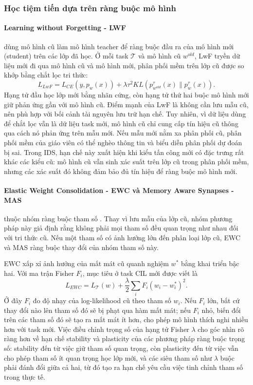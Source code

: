 \subsubsection{Học tiệm tiến dựa trên ràng buộc mô hình}

\paragraph{Learning without Forgetting - LWF}

\cite{li2017lwf} dùng mô hình cũ làm mô hình teacher để ràng buộc đầu ra của mô hình mới (student) trên các lớp đã học. Ở mỗi task $\mathcal{T}$ và mô hình cũ $w^{old}$, LwF tryền dữ liệu mới đi qua mô hình cũ và mô hình mới, phân phối mềm trên lớp cũ được so khớp bằng chắt lọc tri thức:
$$
L_{LwF}=L_{CE}(y,p_w(x))+
\lambda\tau^2 KL(p_{w^{old}}^{\tau}(x)\|p_w^{\tau}(x)).
$$
Hạng tử đầu học lớp mới bằng nhãn cứng, còn hạng tử thứ hai buộc mô hình mới giữ phản ứng gần với mô hình cũ. Điểm mạnh của LwF là không cần lưu mẫu cũ, nên phù hợp với bối cảnh tài nguyên lưu trữ hạn chế. Tuy nhiên, vì dữ liệu dùng để chắt lọc vẫn là dữ liệu task mới, mô hình cũ chỉ cung cấp tín hiệu cũ thông qua cách nó phản ứng trên mẫu mới. Nếu mẫu mới nằm xa phân phối cũ, phân phối mềm của giáo viên có thể nghèo thông tin và biểu diễn phân phối dự đoán bị sai. Trong IDS, hạn chế này xuất hiện khi kiểu tấn công mới có đặc trưng rất khác các kiểu cũ: mô hình cũ vẫn sinh xác suất trên lớp cũ trong phân phối mềm, nhưng các xác suất đó không đảm bảo đủ tín hiệu để ràng buộc mô hình mới.

\paragraph{Elastic Weight Consolidation - EWC và Memory Aware Synapses - MAS} thuộc nhóm ràng buộc tham số \cite{kirkpatrick2017ewc,aljundi2018mas}. Thay vì lưu mẫu của lớp cũ, nhóm phương pháp này giả định rằng không phải mọi tham số đều quan trọng như nhau đối với tri thức cũ. Nếu một tham số có ảnh hưởng lớn đến phân loại lớp cũ, EWC và MAS ràng buộc thay đổi của nhóm tham số này.

EWC xấp xỉ ảnh hưởng của mất mát cũ quanh nghiệm $w^*$ bằng khai triển bậc hai. Với ma trận Fisher $F_i$, mục tiêu ở task CIL mới được viết là
$$
L_{EWC}=L_{\mathcal{T}}(w)+\frac{\lambda}{2}\sum_i F_i(w_i-w_i^*)^2.
$$
Ở đây $F_i$ đo độ nhạy của log-likelihood cũ theo tham số $w_i$. Nếu $F_i$ lớn, bất cứ thay đổi nào lên tham số đó sẽ bị phạt qua hàm mất mát; nếu $F_i$ nhỏ, biến đổi trên các tham số đó sẽ tạo ra mất mát ít hơn, cho phép mô hình thích nghi nhiều hơn với task mới. Việc điều chỉnh trọng số của hạng tử Fisher $\lambda$ cho góc nhìn rõ ràng hơn về hạn chế stability và plasticity của các phương pháp ràng buộc trọng số: stability đến từ việc giữ tham số quan trọng, còn plasticity đến từ việc vẫn cho phép tham số ít quan trọng học lớp mới, và các siêu tham số như $\lambda$ buộc phải đánh đổi giữa cả hai, từ đó tạo ra hạn chế yêu cầu việc tinh chỉnh tham số trong thực tế.

